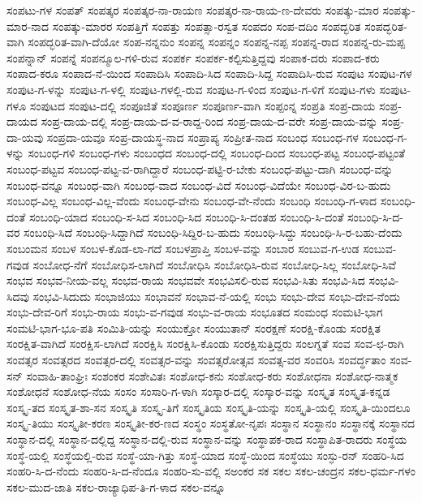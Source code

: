 ಸಂಪಟು-ಗಳ
ಸಂಪತ್
ಸಂಪತ್ಕರ
ಸಂಪತ್ಕರ-ನಾ-ರಾಯಣ
ಸಂಪತ್ಕರ-ನಾ-ರಾಯ-ಣ-ದೇವರು
ಸಂಪತ್ಕು-ಮಾರ
ಸಂಪತ್ಕು-ಮಾರ-ನಾದ
ಸಂಪತ್ಕು-ಮಾರರ
ಸಂಪತ್ತಿಗೆ
ಸಂಪತ್ತು
ಸಂಪತ್ಸಾ-ರಸ್ವತ
ಸಂಪದಂ
ಸಂಪ-ದದಿಂ
ಸಂಪದ್ಭರಿತ
ಸಂಪದ್ಭರಿತ-ವಾಗಿ
ಸಂಪದ್ಭರಿತ-ವಾಗಿ-ದೆಯೋ
ಸಂಪ-ನನ್ನನುಂ
ಸಂಪನ್ನ
ಸಂಪನ್ನಂ
ಸಂಪನ್ನ-ನಪ್ಪ
ಸಂಪನ್ನ-ರಾದ
ಸಂಪನ್ನ-ರು-ಮಪ್ಪ
ಸಂಪನ್ನಾನ್
ಸಂಪನ್ನೆ
ಸಂಪನ್ಮೂಲ-ಗಳಿ-ರುವ
ಸಂಪರ್ಕ
ಸಂಪರ್ಕ-ಕಲ್ಪಿಸುತ್ತಿದ್ದವು
ಸಂಪಾಕ-ದರು
ಸಂಪಾದ-ಕರು
ಸಂಪಾದ-ಕರೂ
ಸಂಪಾದ-ನೆ-ಯಿಂದ
ಸಂಪಾದಿಸಿ
ಸಂಪಾದಿ-ಸಿದ
ಸಂಪಾದಿ-ಸಿದ್ದ
ಸಂಪಾದಿಸಿ-ರುವ
ಸಂಪುಟ
ಸಂಪುಟ-ಗಳ
ಸಂಪುಟ-ಗ-ಳನ್ನು
ಸಂಪುಟ-ಗ-ಳಲ್ಲಿ
ಸಂಪುಟ-ಗಳಲ್ಲಿ-ರುವ
ಸಂಪುಟ-ಗ-ಳಿಂದ
ಸಂಪುಟ-ಗ-ಳಿಗೆ
ಸಂಪುಟ-ಗಳು
ಸಂಪುಟ-ಗಳೂ
ಸಂಪುಟದ
ಸಂಪುಟ-ದಲ್ಲಿ
ಸಂಪೂಜಿತೆ
ಸಂಪೂರ್ಣ
ಸಂಪೂರ್ಣ-ವಾಗಿ
ಸಂಪ್ಪಂನ್ನ
ಸಂಪ್ರತಿ
ಸಂಪ್ರ-ದಾಯ
ಸಂಪ್ರ-ದಾಯದ
ಸಂಪ್ರ-ದಾಯ-ದಲ್ಲಿ
ಸಂಪ್ರ-ದಾಯ-ದ-ವ-ರಾದ್ದ-ರಿಂದ
ಸಂಪ್ರ-ದಾಯ-ದ-ವರೇ
ಸಂಪ್ರ-ದಾಯ-ವನ್ನು
ಸಂಪ್ರ-ದಾ-ಯವು
ಸಂಪ್ರದಾ-ಯವೂ
ಸಂಪ್ರ-ದಾಯಸ್ಥ-ನಾದ
ಸಂಪ್ರಾಪ್ಯ
ಸಂಪ್ರೀತ-ನಾದ
ಸಂಬಂಧ
ಸಂಬಂಧ-ಗಳ
ಸಂಬಂಧ-ಗ-ಳನ್ನು
ಸಂಬಂಧ-ಗಳಿ
ಸಂಬಂಧ-ಗಳು
ಸಂಬಂಧದ
ಸಂಬಂಧ-ದಲ್ಲಿ
ಸಂಬಂಧ-ದಿಂದ
ಸಂಬಂಧ-ಪಟ್ಟ
ಸಂಬಂಧ-ಪಟ್ಟಂತೆ
ಸಂಬಂಧ-ಪಟ್ಟವ
ಸಂಬಂಧ-ಪಟ್ಟ-ವ-ರಾಗಿದ್ದಾರೆ
ಸಂಬಂಧ-ಪಟ್ಟಿ-ರ-ಬೇಕು
ಸಂಬಂಧ-ಪಟ್ಟು-ದಾಗಿ
ಸಂಬಂಧ-ವನ್ನು
ಸಂಬಂಧ-ವನ್ನೂ
ಸಂಬಂಧ-ವಾಗಿ
ಸಂಬಂಧ-ವಾದ
ಸಂಬಂಧ-ವಿದೆ
ಸಂಬಂಧ-ವಿದೆಯೇ
ಸಂಬಂಧ-ವಿರ-ಬ-ಹುದು
ಸಂಬಂಧ-ವಿಲ್ಲ
ಸಂಬಂಧ-ವಿಲ್ಲ-ವೆಂದು
ಸಂಬಂಧ-ವೇನು
ಸಂಬಂಧ-ವೇ-ನೆಂದು
ಸಂಬಂಧಿ
ಸಂಬಂಧಿ-ಗ-ಳಾದ
ಸಂಬಂಧಿ-ದಂತೆ
ಸಂಬಂಧಿ-ಯಾದ
ಸಂಬಂಧಿ-ಸ-ಸಿದ
ಸಂಬಂಧಿ-ಸಿದ
ಸಂಬಂಧಿ-ಸಿ-ದಂತಹ
ಸಂಬಂಧಿ-ಸಿ-ದಂತೆ
ಸಂಬಂಧಿ-ಸಿ-ದ-ವರ
ಸಂಬಂಧಿ-ಸಿದೆ
ಸಂಬಂಧಿ-ಸಿದ್ದಾಗಿದೆ
ಸಂಬಂಧಿ-ಸಿದ್ದಿರ-ಬ-ಹುದು
ಸಂಬಂಧಿ-ಸಿದ್ದು
ಸಂಬಂಧಿ-ಸಿ-ರ-ಬಹು-ದೆಂದು
ಸಂಬಂಮನ
ಸಂಬಳ
ಸಂಬಳ-ಕೊಡ-ಲಾ-ಗದೆ
ಸಂಬಳಪ್ರಾಪ್ತಿ
ಸಂಬಳ-ವನ್ನು
ಸಂಬಾರ
ಸಂಬುವ-ಗ-ಉಡ
ಸಂಬುವ-ಗವುಡ
ಸಂಬೋಧ-ನೆಗೆ
ಸಂಬೋಧಿಸ-ಲಾಗಿದೆ
ಸಂಬೋಧಿಸಿ
ಸಂಬೋಧಿಸಿ-ರುವ
ಸಂಬೋಧಿ-ಸಿಲ್ಲ
ಸಂಬೋಧಿ-ಸಿವೆ
ಸಂಭವ
ಸಂಭವ-ನೀಯ-ವಲ್ಲ
ಸಂಭವ-ರಾಯ
ಸಂಭವವೇ
ಸಂಭವಿಸಲಿ-ರುವ
ಸಂಭವಿ-ಸಿತು
ಸಂಭವಿ-ಸಿದ
ಸಂಭವಿ-ಸಿದವು
ಸಂಭವಿ-ಸಿದುದು
ಸಂಭಾಜಿಯು
ಸಂಭಾವನೆ
ಸಂಭಾವ-ನೆ-ಯಲ್ಲಿ
ಸಂಭು
ಸಂಭು-ದೇವ
ಸಂಭು-ದೇವ-ನೆಂದು
ಸಂಭು-ದೇವ-ರಿಗೆ
ಸಂಭು-ರಾಯ
ಸಂಭು-ವ-ಗವುಡ
ಸಂಭು-ವ-ರಾಯ
ಸಂಭೂತದ
ಸಂಮಂಧ
ಸಂಮಟಿ-ಭಾಗ
ಸಂಮಟಿ-ಭಾಗ-ಭೂ-ಪತಿ
ಸಂಮಿತಿ-ಯನ್ನು
ಸಂಯುಕ್ತೋ
ಸಂಯುತಾನ್
ಸಂರಕ್ಷಣೆ
ಸಂರಕ್ಷಿ-ಕೊಂಡು
ಸಂರಕ್ಷಿತ
ಸಂರಕ್ಷಿತ-ವಾಗಿದೆ
ಸಂರಕ್ಷಿಸ-ಲಾಗಿದೆ
ಸಂರಕ್ಷಿಸಿ
ಸಂರಕ್ಷಿಸಿ-ಕೊಂಡು
ಸಂರಕ್ಷಿಸುತ್ತಿದ್ದರು
ಸಂಲಗ್ನತೆ
ಸಂವ
ಸಂವ-ಛ-ರಾಗಿ
ಸಂವತ್ಸರ
ಸಂವತ್ಸರದ
ಸಂವತ್ಸರ-ದಲ್ಲಿ
ಸಂವತ್ಸರ-ವನ್ನು
ಸಂವತ್ಸರೋತ್ಸವ
ಸಂವತ್ಸ-ವರ
ಸಂವರಿಸಿ
ಸಂವರ್ದ್ಧತಾಂ
ಸಂವ-ಸನ್
ಸಂವಾಹಿ-ತಾಂಘ್ರಿಃ
ಸಂಶಂಕರ
ಸಂಶೇವಿತಃ
ಸಂಶೋಧ-ಕನು
ಸಂಶೋಧ-ಕರು
ಸಂಶೋಧನಾ
ಸಂಶೋಧ-ನಾತ್ಮಕ
ಸಂಶೋಧನೆ
ಸಂಶೋಧ-ನೆಯ
ಸಂಸಂ
ಸಂಸಾರಿ-ಗ-ಳಾಗಿ
ಸಂಸ್ಕಾರ-ದಲ್ಲಿ
ಸಂಸ್ಕಾರ-ವನ್ನು
ಸಂಸ್ಕೃತ
ಸಂಸ್ಕೃತ-ಕನ್ನಡ
ಸಂಸ್ಕೃ-ತದ
ಸಂಸ್ಕೃತ-ಶಾ-ಸನ
ಸಂಸ್ಕೃತಿ
ಸಂಸ್ಕೃ-ತಿಗೆ
ಸಂಸ್ಕೃತಿಯ
ಸಂಸ್ಕೃತಿ-ಯನ್ನು
ಸಂಸ್ಕೃತಿ-ಯಲ್ಲಿ
ಸಂಸ್ಕೃತಿ-ಯಿಂದಲೂ
ಸಂಸ್ಕೃ-ತಿಯು
ಸಂಸ್ಕೃತೀ-ಕರಣ
ಸಂಸ್ಕೃತೀ-ಕರ-ಣದ
ಸಂಸ್ಥಂ
ಸಂಸ್ಥತೋ-ನೃಪಃ
ಸಂಸ್ಥಾನ
ಸಂಸ್ಥಾನಂ
ಸಂಸ್ಥಾನಕ್ಕೆ
ಸಂಸ್ಥಾನದ
ಸಂಸ್ಥಾನ-ದಲ್ಲಿ
ಸಂಸ್ಥಾನ-ದಲ್ಲಿದ್ದ
ಸಂಸ್ಥಾನ-ದಲ್ಲಿ-ರುವ
ಸಂಸ್ಥಾನ-ವನ್ನು
ಸಂಸ್ಥಾಪಕ-ರಾದ
ಸಂಸ್ಥಾಪಿತ-ರಾದರು
ಸಂಸ್ಥೆಯ
ಸಂಸ್ಥೆ-ಯಲ್ಲಿ
ಸಂಸ್ಥೆಯಲ್ಲಿ-ರುವ
ಸಂಸ್ಥೆ-ಯಾ-ಗಿತ್ತು
ಸಂಸ್ಥೆ-ಯಾದ
ಸಂಸ್ಥೆ-ಯಿಂದ
ಸಂಸ್ಥೆಯು
ಸಂಸ್ಫು-ರನ್
ಸಂಹರಿ-ಸಿದ
ಸಂಹರಿ-ಸಿ-ದ-ನೆಂದು
ಸಂಹರಿ-ಸಿ-ದ-ನೆಂದೂ
ಸಂಹರಿ-ಸು-ವಲ್ಲಿ
ಸಅಂಕರ
ಸಕ
ಸಕಲ
ಸಕಲ-ಚಂದ್ರನ
ಸಕಲ-ಧರ್ಮ-ಗಳಂ
ಸಕಲ-ಮುದ-ಜಾತಿ
ಸಕಲ-ರಾಜ್ಯಾಧಿಪ-ತಿ-ಗ-ಳಾದ
ಸಕಲ-ವನ್ನೂ
